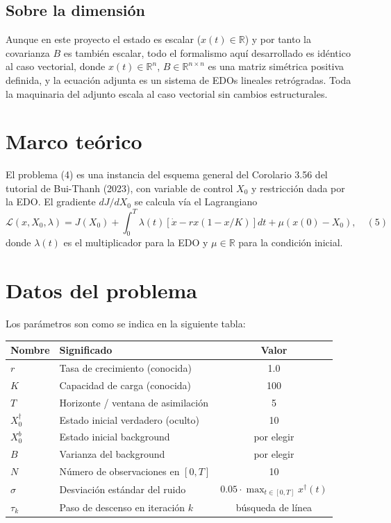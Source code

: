 \documentclass[12pt,spanish,mexico]{article}
\numberwithin{equation}{section}
\theoremstyle{definition}
\theoremstyle{remark}
\begin{document}
\subsection{Sobre la dimensión}
Aunque en este proyecto el estado es escalar (\(x(t) \in \mathbb{R}\)) y por tanto la covarianza \(B\) es también escalar, todo el formalismo aquí desarrollado es idéntico al caso vectorial, donde \(x(t) \in \mathbb{R}^n\), \(B \in \mathbb{R}^{n \times n}\) es una matriz simétrica positiva definida, y la ecuación adjunta es un sistema de EDOs lineales retrógradas. Toda la maquinaria del adjunto escala al caso vectorial sin cambios estructurales.

\section{Marco teórico}
El problema (4) es una instancia del esquema general del Corolario 3.56 del tutorial de Bui-Thanh (2023), con variable de control \(X_0\) y restricción dada por la EDO. El gradiente \(dJ/dX_0\) se calcula vía el Lagrangiano
\[
\mathcal{L}(x, X_0, \lambda) = J(X_0) + \int_0^T \lambda(t) \left[ \dot{x} - r x(1 - x/K) \right] dt + \mu(x(0) - X_0), \quad (5)
\]
donde \(\lambda(t)\) es el multiplicador para la EDO y \(\mu \in \mathbb{R}\) para la condición inicial.

\section{Datos del problema}
Los parámetros son como se indica en la siguiente tabla:

\begin{table}[H]
\centering
\begin{tabular}{|l|l|c|}
\hline
Nombre & Significado & Valor \\
\hline
\(r\) & Tasa de crecimiento (conocida) & 1.0 \\
\(K\) & Capacidad de carga (conocida) & 100 \\
\(T\) & Horizonte / ventana de asimilación & 5 \\
\(X_0^{\dagger}\) & Estado inicial verdadero (oculto) & 10 \\
\(X_0^{b}\) & Estado inicial background & por elegir \\
\(B\) & Varianza del background & por elegir \\
\(N\) & Número de observaciones en \([0, T]\) & 10 \\
\(\sigma\) & Desviación estándar del ruido & \(0.05 \cdot \max_{t\in[0,T]} x^{\dagger}(t)\) \\
\(\tau_k\) & Paso de descenso en iteración \(k\) & búsqueda de línea \\
\hline
\end{tabular}
\end{table}
\end{document}
